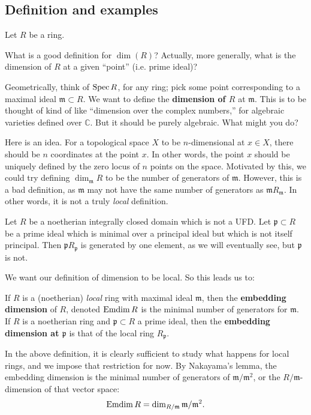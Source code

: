 \subsection{Definition and examples}
Let $R$ be a   ring. 
\begin{question} 
What is a good definition for $\dim(R)$? Actually, more generally, 
what is the dimension of $R$ at a given ``point'' (i.e. prime ideal)?
\end{question} 

Geometrically, think of $\operatorname{Spec} R$, for any ring; pick some point corresponding to a maximal
ideal $\mathfrak{m} \subset R$. We want to define the \textbf{dimension of $R$}
at $\mathfrak{m}$. This is to be thought of kind of like ``dimension over the
complex numbers,'' for algebraic varieties defined over $\mathbb{C}$. But it
should be purely algebraic. 
What might you do?


Here  is an idea. For a topological space $X$ to be $n$-dimensional at $x \in
X$, there should be $n$ coordinates at the point $x$. In other words, the
point $x$ should be uniquely  defined
by the zero locus of $n$ points on the space.
Motivated by this, we could try defining $\dim_{\mathfrak{m}} R$
to be the number of generators of $\mathfrak{m}$.
However, this is a bad definition, as $\mathfrak{m}$ may not have the same number of
generators as $\mathfrak{m}R_{\mathfrak{m}}$. In other words, it is not a
truly \emph{local} definition.
\begin{example} 
Let $R$ be a noetherian integrally closed domain which is not a UFD. Let $\mathfrak{p}
\subset R$ be a prime ideal which is minimal over a principal ideal but which
is not itself principal. Then $\mathfrak{p}R_{\mathfrak{p}}$ is generated by
one element, as we will eventually see, but $\mathfrak{p}$ is not.
\end{example} 

We want our definition of dimension to be
local.
So this leads us to:
\begin{definition} 
If $R$ is a (noetherian) \emph{local} ring with maximal ideal $\mathfrak{m}$,
then the \textbf{embedding dimension} of $R$, denoted $\operatorname{Emdim} R$ is
the minimal number of generators for $\mathfrak{m}$. If $R$ is a  noetherian
ring and $\mathfrak{p} \subset R$ a prime ideal, then the \textbf{embedding
dimension at $\mathfrak{p}$} is that of the local ring $R_{\mathfrak{p}}$.
\end{definition} 

In the above definition, it is clearly sufficient to study what happens for
local rings, and we impose that restriction for now. By Nakayama's lemma, the
embedding dimension is the minimal number of generators of
$\mathfrak{m}/\mathfrak{m}^2$, or the $R/\mathfrak{m}$-dimension of that vector
space:
\[ \operatorname{Emdim} R = \dim_{R/\mathfrak{m}} \mathfrak{m}/ \mathfrak{m}^2.  \]


